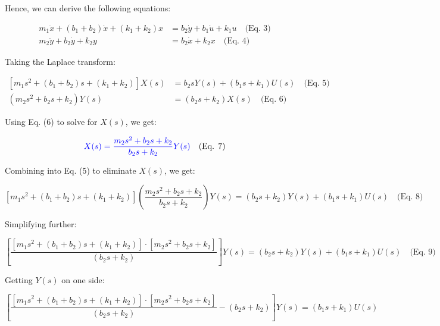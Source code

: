 \documentclass{article}
\begin{document}
Hence, we can derive the following equations:

\begin{equation*}
	\begin{aligned}
		m_1 \ddot{x} + (b_1 + b_2) \dot{x} + (k_1 + k_2) x & = b_2 \dot{y} + b_1 \dot{u} + k_1 u \quad \text{(Eq. 3)} \\
		m_2 \ddot{y} + b_2 \dot{y} + k_2 y                 & = b_2 \dot{x} + k_2 x \quad \text{(Eq. 4)}               
	\end{aligned}
\end{equation*}

Taking the Laplace transform:

\begin{equation*}
	\begin{aligned}
		[m_1 s^2 + (b_1 + b_2)s + (k_1 + k_2)]X(s) & = b_2 s Y(s) + (b_1 s + k_1) U(s) \quad \text{(Eq. 5)} \\
		(m_2 s^2 + b_2 s + k_2)Y(s)                & = (b_2 s + k_2) X(s) \quad \text{(Eq. 6)}              
	\end{aligned}
\end{equation*}

Using Eq. (6) to solve for \( X(s) \), we get:

\begin{equation*}
	\textcolor{blue}{X(s) = \frac{m_2 s^2 + b_2 s + k_2}{b_2 s + k_2}Y(s)} \quad \text{(Eq. 7)}
\end{equation*}

Combining into Eq. (5) to eliminate \( X(s) \), we get:

\begin{equation*}
	\left[ m_1 s^2 + (b_1 + b_2) s + (k_1 + k_2) \right] \left( \frac{m_2 s^2 + b_2 s + k_2}{b_2 s + k_2} \right) Y(s)  = (b_2 s + k_2) Y(s) + (b_1 s + k_1) U(s) \quad \text{(Eq. 8)}
\end{equation*}

Simplifying further:

\begin{equation*}
	\left[ \frac{[m_1 s^2 + (b_1 + b_2) s + (k_1 + k_2)]\cdot [m_2 s^2 + b_2 s + k_2]}{(b_2 s + k_2)} \right] Y(s) = (b_2 s + k_2) Y(s) + (b_1 s + k_1) U(s) \quad \text{(Eq. 9)}
\end{equation*}

Getting \( Y(s) \) on one side:

\begin{equation*}
	\left[ \frac{[m_1 s^2 + (b_1 + b_2) s + (k_1 + k_2)]\cdot [m_2 s^2 + b_2 s + k_2]}{(b_2 s + k_2)} - (b_2 s + k_2) \right] Y(s) = (b_1 s + k_1) U(s)
\end{equation*}
\end{document}

